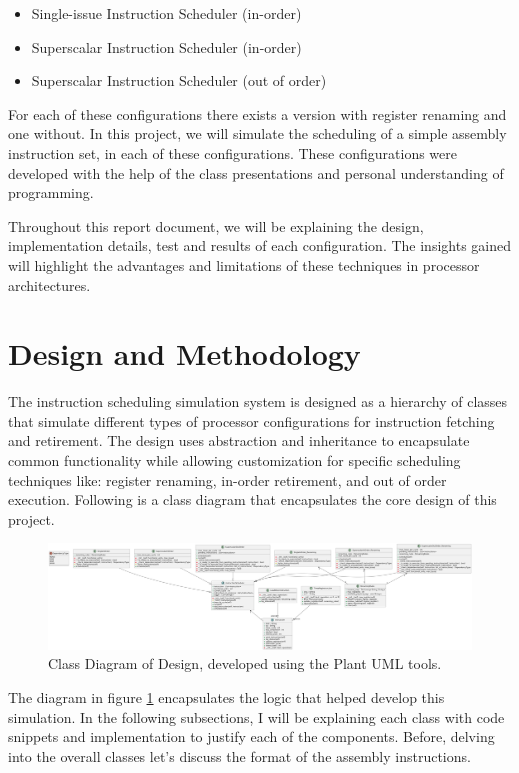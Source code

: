 \documentclass{article}
\begin{document}
\begin{itemize}
    \item Single-issue Instruction Scheduler (in-order)
    \item Superscalar Instruction Scheduler (in-order)
    \item Superscalar Instruction Scheduler (out of order) 
\end{itemize}

For each of these configurations there exists a version with register renaming and one without. In this project, we will simulate the scheduling of a simple assembly instruction set, in each of these configurations. These configurations were developed with the help of the class presentations and personal understanding of programming.

Throughout this report document, we will be explaining the design, implementation details, test and results of each configuration. The insights gained will highlight the advantages and limitations of these techniques in processor architectures. 

\section{Design and Methodology}
The instruction scheduling simulation system is designed as a hierarchy of classes that simulate different types of processor configurations for instruction fetching and retirement. The design uses abstraction and inheritance to encapsulate common functionality while allowing customization for specific scheduling techniques like: register renaming, in-order retirement, and out of order execution. Following is a class diagram that encapsulates the core design of this project.

\begin{figure}[H]
    \centering
    \includegraphics[width=1\textwidth]{ClassDiagram.png}  
    \caption{Class Diagram of Design, developed using the Plant UML tools.}  
    \label{fig:ClassDiagram}
\end{figure}

The diagram in figure \ref{fig:ClassDiagram} encapsulates the logic that helped develop this simulation. In the following subsections, I will be explaining each class with code snippets and implementation to justify each of the components. Before, delving into the overall classes let's discuss the format of the assembly instructions. 
\end{document}
